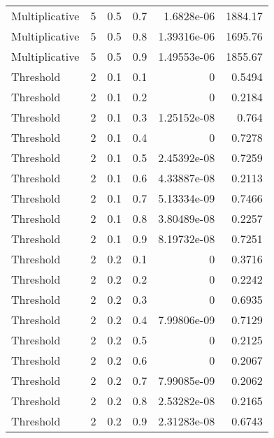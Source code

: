 \documentclass{article}
\begin{document}
\begin{longtable}[H]{lrrrrr}
 Multiplicative &       5 &   0.5 &            0.7 &   1.6828e-06  &       1884.17   \\
 Multiplicative &       5 &   0.5 &            0.8 &   1.39316e-06 &       1695.76   \\
 Multiplicative &       5 &   0.5 &            0.9 &   1.49553e-06 &       1855.67   \\
 Threshold      &       2 &   0.1 &            0.1 &   0           &          0.5494 \\
 Threshold      &       2 &   0.1 &            0.2 &   0           &          0.2184 \\
 Threshold      &       2 &   0.1 &            0.3 &   1.25152e-08 &          0.764  \\
 Threshold      &       2 &   0.1 &            0.4 &   0           &          0.7278 \\
 Threshold      &       2 &   0.1 &            0.5 &   2.45392e-08 &          0.7259 \\
 Threshold      &       2 &   0.1 &            0.6 &   4.33887e-08 &          0.2113 \\
 Threshold      &       2 &   0.1 &            0.7 &   5.13334e-09 &          0.7466 \\
 Threshold      &       2 &   0.1 &            0.8 &   3.80489e-08 &          0.2257 \\
 Threshold      &       2 &   0.1 &            0.9 &   8.19732e-08 &          0.7251 \\
 Threshold      &       2 &   0.2 &            0.1 &   0           &          0.3716 \\
 Threshold      &       2 &   0.2 &            0.2 &   0           &          0.2242 \\
 Threshold      &       2 &   0.2 &            0.3 &   0           &          0.6935 \\
 Threshold      &       2 &   0.2 &            0.4 &   7.99806e-09 &          0.7129 \\
 Threshold      &       2 &   0.2 &            0.5 &   0           &          0.2125 \\
 Threshold      &       2 &   0.2 &            0.6 &   0           &          0.2067 \\
 Threshold      &       2 &   0.2 &            0.7 &   7.99085e-09 &          0.2062 \\
 Threshold      &       2 &   0.2 &            0.8 &   2.53282e-08 &          0.2165 \\
 Threshold      &       2 &   0.2 &            0.9 &   2.31283e-08 &          0.6743 \\

\end{longtable}
\end{document}
